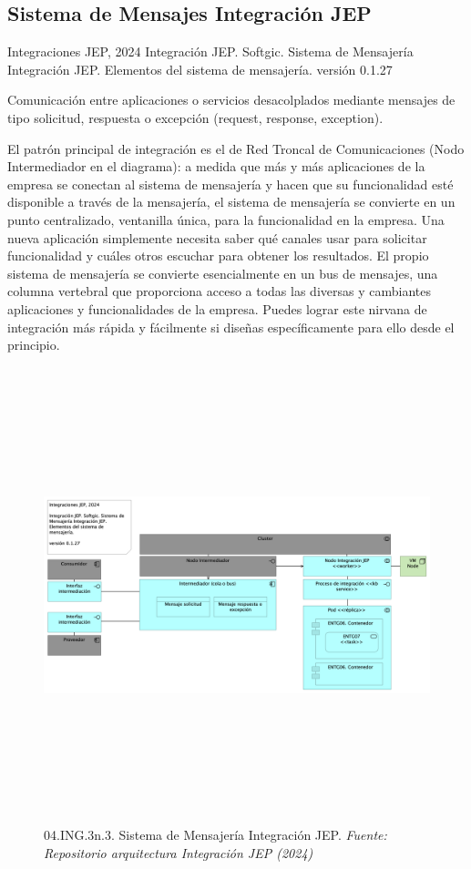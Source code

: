 \documentclass[
  paper=a4,
  ,captions=tableheading
]{scrartcl}
\renewenvironment{quote}{\begin{customblockquote}\list{}{\rightmargin=0em\leftmargin=0em}%
\item\relax\color{blockquote-text}\ignorespaces}{\unskip\unskip\endlist\end{customblockquote}}
\begin{document}
\subsection{Sistema de Mensajes Integración
JEP}\label{sec:sistema-de-mensajes-integraciuxf3n-jep}

\begin{quote}
Integraciones JEP, 2024 Integración JEP. Softgic. Sistema de Mensajería
Integración JEP. Elementos del sistema de mensajería. versión 0.1.27
\end{quote}

Comunicación entre aplicaciones o servicios desacolplados mediante
mensajes de tipo solicitud, respuesta o excepción (request, response,
exception).

El patrón principal de integración es el de Red Troncal de
Comunicaciones (Nodo Intermediador en el diagrama): a medida que más y
más aplicaciones de la empresa se conectan al sistema de mensajería y
hacen que su funcionalidad esté disponible a través de la mensajería, el
sistema de mensajería se convierte en un punto centralizado, ventanilla
única, para la funcionalidad en la empresa. Una nueva aplicación
simplemente necesita saber qué canales usar para solicitar funcionalidad
y cuáles otros escuchar para obtener los resultados. El propio sistema
de mensajería se convierte esencialmente en un bus de mensajes, una
columna vertebral que proporciona acceso a todas las diversas y
cambiantes aplicaciones y funcionalidades de la empresa. Puedes lograr
este nirvana de integración más rápida y fácilmente si diseñas
específicamente para ello desde el principio.

\begin{figure}
\centering
\includegraphics[width=\textwidth,height=5.20833in]{images/04.ING.3n.3.SistemadeMensajeríaIntegraciónJEP.png}
\caption{04.ING.3n.3. Sistema de Mensajería Integración JEP.
\emph{Fuente: Repositorio arquitectura Integración JEP
(2024)}}\label{fig:id-402ea0d886a14c76a3459332f1f2953c}
\end{figure}
\end{document}
